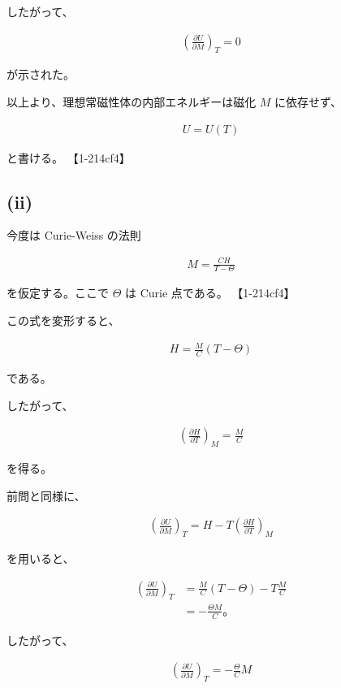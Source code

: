 \documentclass[platex,dvipdfmx,a4paper]{jsarticle}
\begin{document}
したがって、

\begin{align*}
\left(
\frac{\partial U}{\partial M}
\right)_T
=0
\end{align*}

が示された。

以上より、理想常磁性体の内部エネルギーは磁化 $M$ に依存せず、

\begin{align*}
U=U(T)
\end{align*}

と書ける。 【1-214cf4】

\subsection{(ii)}

今度は Curie-Weiss の法則

\begin{align*}
M
=
\frac{CH}{T-\Theta}
\end{align*}

を仮定する。ここで $\Theta$ は Curie 点である。 【1-214cf4】

この式を変形すると、

\begin{align*}
H
=
\frac{M}{C}(T-\Theta)
\end{align*}

である。

したがって、

\begin{align*}
\left(
\frac{\partial H}{\partial T}
\right)_M
=
\frac{M}{C}
\end{align*}

を得る。

前問と同様に、

\begin{align*}
\left(
\frac{\partial U}{\partial M}
\right)_T
=
H
-
T
\left(
\frac{\partial H}{\partial T}
\right)_M
\end{align*}

を用いると、

\begin{align*}
\left(
\frac{\partial U}{\partial M}
\right)_T
&=
\frac{M}{C}(T-\Theta)
-
T\frac{M}{C} \\
&=
-\frac{\Theta M}{C}。
\end{align*}

したがって、

\begin{align*}
\left(
\frac{\partial U}{\partial M}
\right)_T
=
-\frac{\Theta}{C}M
\end{align*}
\end{document}
